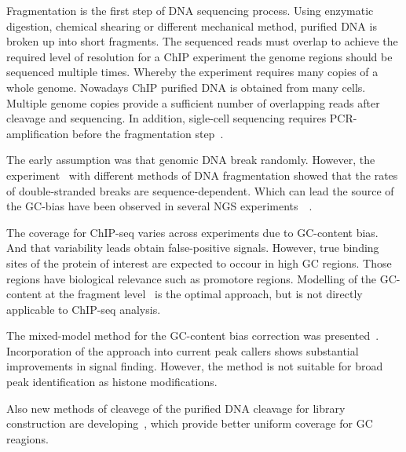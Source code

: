Fragmentation is the first step of DNA sequencing process.
Using enzymatic digestion, chemical shearing or different mechanical method, purified DNA is broken up into short fragments.
The sequenced reads must overlap to achieve the required level of resolution for a ChIP experiment the genome regions should be sequenced multiple times.
Whereby the experiment requires many copies of a whole genome.
Nowadays ChIP purified DNA is obtained from many cells.
Multiple genome copies provide a sufficient number of overlapping reads after cleavage and sequencing.
In addition, sigle-cell sequencing requires PCR-amplification before the fragmentation step~\cite{clark2016single}.

The early assumption was that genomic DNA break randomly.
However, the experiment~\cite{poptsova2014non} with different methods of DNA fragmentation showed that the rates of double-stranded breaks are sequence-dependent.
Which can lead the source of the GC-bias have been observed in several NGS experiments~\cite{benjamini2012summarizing}~\cite{dohm2008substantial}. 

The coverage for ChIP-seq varies across experiments due to GC-content bias.
And that variability leads obtain false-positive signals.
However, true binding sites of the protein of interest are expected to occour in high GC regions.
Those regions have biological relevance such as promotore regions.
Modelling of the GC-content at the fragment level~\cite{benjamini2012summarizing} is the optimal approach, but is not directly applicable to ChIP-seq analysis.

The mixed-model method for the GC-content bias correction was presented~\cite{teng2017accounting}.
Incorporation of the approach into current peak callers shows substantial improvements in signal finding.
However, the method is not suitable for broad peak identification as histone modifications.

Also new methods of cleavege of the purified DNA cleavage for library construction are developing~\cite{}, which provide better uniform coverage for GC reagions.


